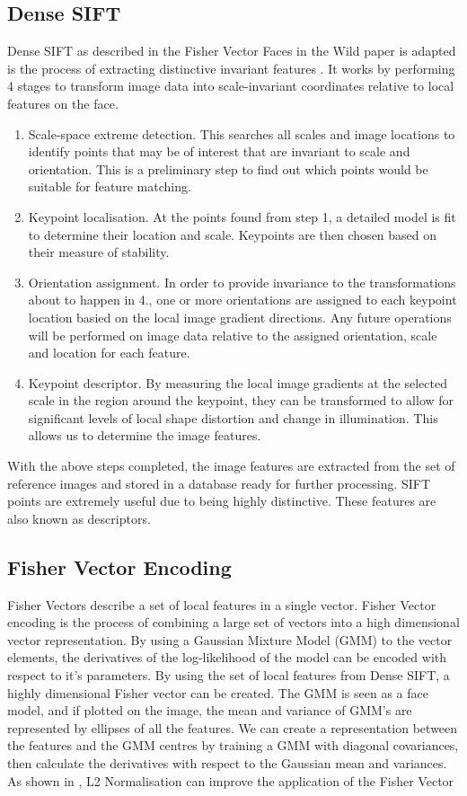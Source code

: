 \documentclass[12pt, a4paper]{article}
\begin{document}
\subsection*{Dense SIFT}
Dense SIFT as described in the Fisher Vector Faces in the Wild paper is adapted is the process of extracting distinctive invariant features \cite{denseSift}. It works by performing 4 stages to transform image data into scale-invariant coordinates relative to local features on the face.
\begin{enumerate}
\item Scale-space extreme detection. This searches all scales and image locations to identify points that may be of interest that are invariant to scale and orientation. This is a preliminary step to find out which points would be suitable for feature matching.
\item Keypoint localisation. At the points found from step 1, a detailed model is fit to determine their location and scale. Keypoints are then chosen based on their measure of stability.
\item Orientation assignment. In order to provide invariance to the transformations about to happen in 4., one or more orientations are assigned to each keypoint location basied on the local image gradient directions. Any future operations will be performed on image data relative to the assigned orientation, scale and location for each feature.
\item Keypoint descriptor. By measuring the local image gradients at the selected scale in the region around the keypoint, they can be transformed to allow for significant levels of local shape distortion and change in illumination. This allows us to determine the image features.
\end{enumerate}
With the above steps completed, the image features are extracted from the set of reference images and stored in a database ready for further processing. SIFT points are extremely useful due to being highly distinctive. These features are also known as descriptors.

\subsection*{Fisher Vector Encoding}
Fisher Vectors describe a set of local features in a single vector. Fisher Vector encoding is the process of combining a large set of vectors into a high dimensional vector representation. By using a Gaussian Mixture Model (GMM) to the vector elements, the derivatives of the log-likelihood of the model can be encoded with respect to it’s parameters. By using the set of local features from Dense SIFT, a highly dimensional Fisher vector can be created. The GMM is seen as a face model, and if plotted on the image, the mean and variance of GMM’s are represented by ellipses of all the features. We can create a representation between the features and the GMM centres by training a GMM with diagonal covariances, then calculate the derivatives with respect to the Gaussian mean and variances. As shown in \cite{improvingFisher}, L2 Normalisation can improve the application of the Fisher Vector 
\end{document}

